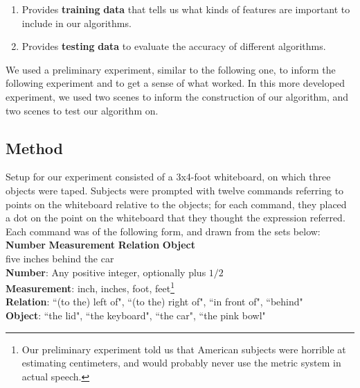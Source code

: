 \documentclass[12pt,letterpaper]{article}
\newcommand\tab[1][1cm]{\hspace*{#1}}
\begin{document}
\begin{enumerate}[(1)]

\item Provides \textbf{training} \textbf{data} that tells us what kinds of features are important to include in our algorithms.\\
\item Provides \textbf{testing} \textbf{data} to evaluate the accuracy of different algorithms.
\end{enumerate}

We used a preliminary experiment, similar to the following one, to inform the following experiment and to get a sense of what worked. In this more developed experiment, we used two scenes to inform the construction of our algorithm, and two scenes to test our algorithm on.

\subsection{Method}

Setup for our experiment consisted of a 3x4-foot whiteboard, on which three objects were taped. Subjects were prompted with twelve commands referring to points on the whiteboard relative to the objects; for each command, they placed a dot on the point on the whiteboard that they thought the expression referred. Each command was of the following form, and drawn from the sets below:\\

\noindent \textbf{Number} \tab	\textbf{Measurement}	 \tab	\textbf{Relation} \tab		\textbf{Object}\\
five		\tab \tab  	inches	\tab\tab\tab   	behind	\tab	 	the car\\

\noindent \textbf{Number}: Any positive integer, optionally plus $1/2$ \\
\textbf{Measurement}: inch, inches, foot, feet\footnote{Our preliminary experiment told us that American subjects were horrible at estimating centimeters, and would probably never use the metric system in actual speech.}\\
\textbf{Relation}: ``(to the) left of", ``(to the) right of", ``in front of", ``behind"\\
\textbf{Object}: ``the lid", ``the keyboard", ``the car", ``the pink bowl"\\
\end{document}
